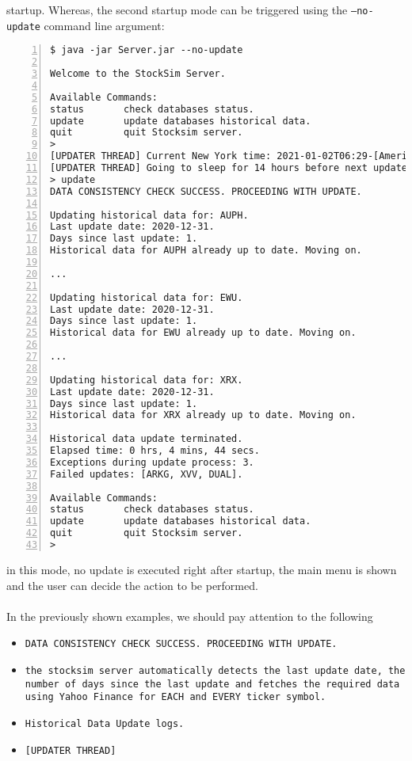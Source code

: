 startup. Whereas, the second startup mode can be triggered using the
\texttt{--no-update} command line argument:
\begin{lstlisting}[basicstyle=\footnotesize\ttfamily,language={},numbers=left,
numberstyle=\footnotesize,numbersep=8pt,frame=single]
$ java -jar Server.jar --no-update

Welcome to the StockSim Server.

Available Commands:
status       check databases status.
update       update databases historical data.
quit         quit Stocksim server.
> 
[UPDATER THREAD] Current New York time: 2021-01-02T06:29-[America/New_York]
[UPDATER THREAD] Going to sleep for 14 hours before next update.
> update
DATA CONSISTENCY CHECK SUCCESS. PROCEEDING WITH UPDATE.

Updating historical data for: AUPH.
Last update date: 2020-12-31.
Days since last update: 1.
Historical data for AUPH already up to date. Moving on.

...

Updating historical data for: EWU.
Last update date: 2020-12-31.
Days since last update: 1.
Historical data for EWU already up to date. Moving on.

...

Updating historical data for: XRX.
Last update date: 2020-12-31.
Days since last update: 1.
Historical data for XRX already up to date. Moving on.

Historical data update terminated.
Elapsed time: 0 hrs, 4 mins, 44 secs.
Exceptions during update process: 3.
Failed updates: [ARKG, XVV, DUAL].

Available Commands:
status       check databases status.
update       update databases historical data.
quit         quit Stocksim server.
> 
\end{lstlisting}
in this mode, no update is executed right after startup, the main menu is shown
and the user can decide the action to be performed.\\
\\
In the previously shown examples, we should pay attention to the following
\begin{itemize}
    \item \texttt{DATA CONSISTENCY CHECK SUCCESS. PROCEEDING WITH UPDATE.}
    \item \texttt{the stocksim server automatically detects the last update
    date, the number of days since the last update and fetches the required
    data using Yahoo Finance for EACH and EVERY ticker symbol.}
    \item \texttt{Historical Data Update logs.}
    \item \texttt{[UPDATER THREAD]}
\end{itemize}
